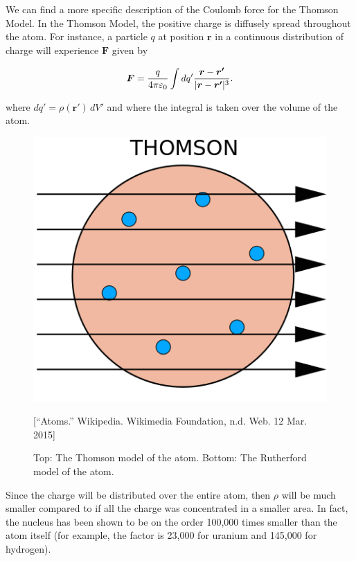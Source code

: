 We can find a more specific description of the Coulomb force for the Thomson Model. In the Thomson Model, the positive charge is diffusely spread throughout the atom. For instance, a particle $q$ at position $\boldsymbol{r}$ in a continuous distribution of charge will experience $\boldsymbol{F}$ given by

\begin{equation}
   \boldsymbol{F} = {q\over 4\pi\varepsilon_0}\int dq' {\boldsymbol{r} - \boldsymbol{r'} \over |\boldsymbol{r} - \boldsymbol{r'}|^3}.
   \label{Continuous Coulomb}
\end{equation}

where $dq' = \rho(\boldsymbol{r'})\,dV'$ and where the integral is taken over the volume of the atom.

\begin{figure}[t]
  \includegraphics[scale=0.25]{ThomsonRutherford.png}
  \begin{center}
  \caption{Top: The Thomson model of the atom. Bottom: The Rutherford model of the atom.}[\footnotesize{``Atoms.'' Wikipedia. Wikimedia Foundation, n.d. Web. 12 Mar. 2015}]
  \label{ThomsonRutherford}
  \end{center}
\end{figure}

Since the charge will be distributed over the entire atom, then $\rho$ will be much smaller compared to if all the charge was concentrated in a smaller area. In fact, the nucleus has been shown to be on the order 100,000 times smaller than the atom itself (for example, the factor is 23,000 for uranium and 145,000 for hydrogen).

